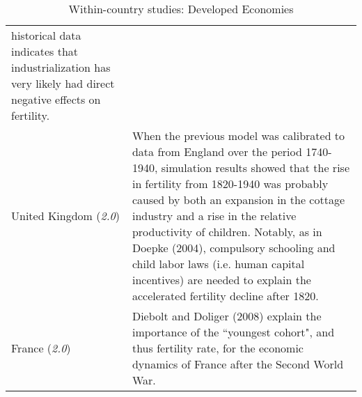 \documentclass[12pt]{article}%
\begin{document}
\begin{table}[h]
\begin{center}
\begin{tabularx}{\linewidth}{lX}
historical data indicates that industrialization has very likely had direct negative effects on fertility.\\
United Kingdom (\emph{2.0}) & When the previous model was calibrated to data from England over the period 1740-1940,
simulation results showed that the rise in fertility from 1820-1940 was probably caused by both an expansion in the
cottage industry and a rise in the relative productivity of children. Notably, as in Doepke (2004), compulsory schooling
and child labor laws (i.e. human capital incentives) are needed to explain the accelerated fertility decline after
1820.\\
France (\emph{2.0}) & Diebolt and Doliger (2008) explain the importance of the ``youngest cohort", and thus fertility
rate, for the economic dynamics of France after the Second World War.\\
\end{tabularx}
\end{center}
\caption{Within-country studies: Developed Economies}
\label{tab:}
\end{table}
\end{document}
